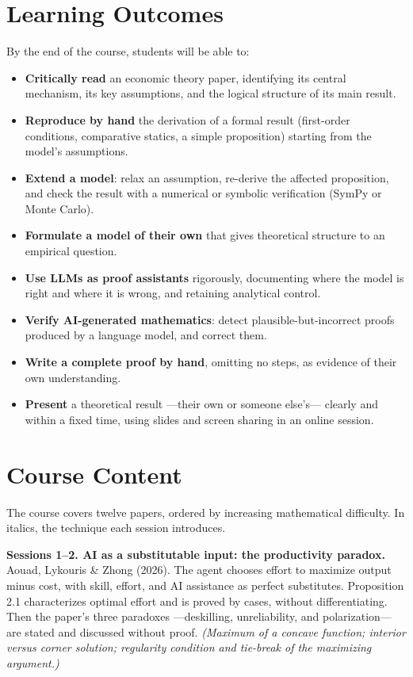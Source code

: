 \documentclass[11pt]{article}
\begin{document}
\section{Learning Outcomes}

By the end of the course, students will be able to:

\begin{itemize}
\item \textbf{Critically read} an economic theory paper, identifying its central mechanism, its key assumptions, and the logical structure of its main result.
\item \textbf{Reproduce by hand} the derivation of a formal result (first-order conditions, comparative statics, a simple proposition) starting from the model's assumptions.
\item \textbf{Extend a model}: relax an assumption, re-derive the affected proposition, and check the result with a numerical or symbolic verification (SymPy or Monte Carlo).
\item \textbf{Formulate a model of their own} that gives theoretical structure to an empirical question.
\item \textbf{Use LLMs as proof assistants} rigorously, documenting where the model is right and where it is wrong, and retaining analytical control.
\item \textbf{Verify AI-generated mathematics}: detect plausible-but-incorrect proofs produced by a language model, and correct them.
\item \textbf{Write a complete proof by hand}, omitting no steps, as evidence of their own understanding.
\item \textbf{Present} a theoretical result ---their own or someone else's--- clearly and within a fixed time, using slides and screen sharing in an online session.
\end{itemize}

\section{Course Content}

The course covers twelve papers, ordered by increasing mathematical difficulty. In italics, the technique each session introduces.

\textbf{Sessions 1--2. AI as a substitutable input: the productivity paradox.}
Aouad, Lykouris \& Zhong (2026). The agent chooses effort to maximize output minus cost, with skill, effort, and AI assistance as perfect substitutes. Proposition 2.1 characterizes optimal effort and is proved by cases, without differentiating. Then the paper's three paradoxes ---deskilling, unreliability, and polarization--- are stated and discussed without proof.
\emph{(Maximum of a concave function; interior versus corner solution; regularity condition and tie-break of the maximizing argument.)}
\end{document}

